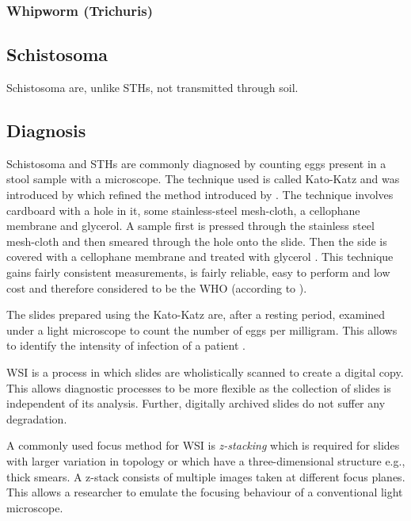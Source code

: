 \subsubsection{Whipworm (Trichuris)}
\label{sec:Foundations:NTDs:STHs:Whipworm}

\subsection{Schistosoma}
\label{sec:Foundations:NTDs:STHs:Schistosoma}

Schistosoma are, unlike \ac{STHs}, not transmitted through soil.  

\subsection{Diagnosis}
\label{sec:Foundations:NTDs:Diagnosis}

Schistosoma and \ac{STHs} are commonly diagnosed by counting eggs present in a stool sample with a microscope. The technique used is called Kato-Katz  and was introduced by \textcite{katz1972simple} which refined the method introduced by \citeauthor{kato1954comparative} \cite{kato1954comparative,kato1960correct}. The technique involves cardboard with a hole in it, some stainless-steel mesh-cloth, a cellophane membrane and glycerol. A sample first is pressed through the stainless steel mesh-cloth and then smeared through the hole onto the slide. Then the side is covered with a cellophane membrane and treated with glycerol \cite{mbongngwese2020diagnostic}. This technique gains fairly consistent measurements, is fairly reliable, easy to perform and low cost \cite{katz1972simple} and therefore considered to be the \ac{WHO}  (according to \textcite{mbongngwese2020diagnostic}).

The slides prepared using the Kato-Katz are, after a resting period, examined under a light microscope to count the number of eggs per milligram. This allows to identify the intensity of infection of a patient \cite{feasey2010neglected}. 

\ac{WSI} \cite{ghaznavi2013digital, hanna2019whole, el-gabry2014wholeslide} is a process in which slides are wholistically scanned to create a digital copy. This allows diagnostic processes to be more flexible as the collection of slides is independent of its analysis. Further, digitally archived slides do not suffer any degradation. 

A commonly used focus method for \ac{WSI} is \emph{z-stacking} \cite{el-gabry2014wholeslide} which is required for slides with larger variation in topology or which have a three-dimensional structure e.g., thick smears. A z-stack consists of multiple images taken at different focus planes. This allows a researcher to emulate the focusing behaviour of a conventional light microscope.  


